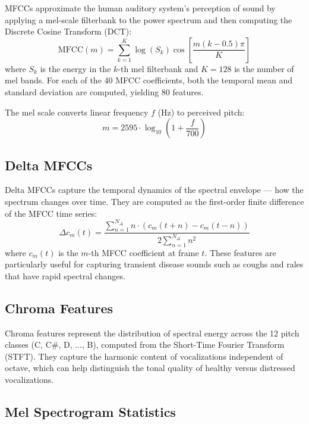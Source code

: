 \documentclass[12pt,a4paper]{report}
\begin{document}
MFCCs approximate the human auditory system's perception of sound by applying a mel-scale filterbank to the power spectrum and then computing the Discrete Cosine Transform (DCT):
\begin{equation}
    \text{MFCC}(m) = \sum_{k=1}^{K} \log(S_k) \cos\left[\frac{m(k - 0.5)\pi}{K}\right]
\label{eq:mfcc}
\end{equation}
where $S_k$ is the energy in the $k$-th mel filterbank and $K = 128$ is the number of mel bands. For each of the 40 MFCC coefficients, both the temporal mean and standard deviation are computed, yielding 80 features.

The mel scale converts linear frequency $f$ (Hz) to perceived pitch:
\begin{equation}
    m = 2595 \cdot \log_{10}\left(1 + \frac{f}{700}\right)
\end{equation}

\subsection{Delta MFCCs}

Delta MFCCs capture the temporal dynamics of the spectral envelope --- how the spectrum changes over time. They are computed as the first-order finite difference of the MFCC time series:
\begin{equation}
    \Delta c_m(t) = \frac{\sum_{n=1}^{N_\Delta} n \cdot (c_m(t+n) - c_m(t-n))}{2 \sum_{n=1}^{N_\Delta} n^2}
\end{equation}
where $c_m(t)$ is the $m$-th MFCC coefficient at frame $t$. These features are particularly useful for capturing transient disease sounds such as coughs and rales that have rapid spectral changes.

\subsection{Chroma Features}

Chroma features represent the distribution of spectral energy across the 12 pitch classes (C, C\#, D, ..., B), computed from the Short-Time Fourier Transform (STFT). They capture the harmonic content of vocalizations independent of octave, which can help distinguish the tonal quality of healthy versus distressed vocalizations.

\subsection{Mel Spectrogram Statistics}
\end{document}
